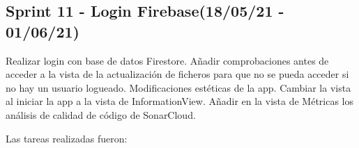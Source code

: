 

\subsection{Sprint 11 - Login Firebase(18/05/21 - 01/06/21)}
Realizar login con base de datos Firestore. Añadir comprobaciones antes de acceder a la vista de la actualización de ficheros para que no se pueda acceder si no hay un usuario logueado. Modificaciones estéticas de la app. Cambiar la vista al iniciar la app a la vista de InformationView. Añadir en la vista de Métricas los análisis de calidad de código de SonarCloud.

Las tareas realizadas fueron:
